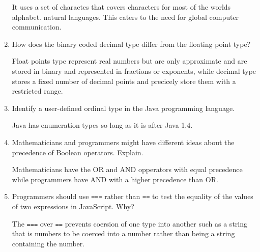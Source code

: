 \begin{enumerate}
  \begin{answer}

   It uses a set of charactes that covers characters for most of the worlds alphabet.  natural languages. This caters to the need for global computer communication.

    \end{answer}

  \item How does the binary coded decimal type differ from the
    floating point type?

  \begin{answer}

    Float points type represent real numbers but are only approximate and are stored in binary and represented in fractions or exponents, while decimal type stores a fixed number of decimal points and precicely store them with a restricted range.

    \end{answer}

  \item Identify a user-defined ordinal type in the Java programming
    language.

  \begin{answer}

    Java has enumeration types so long as it is after Java 1.4.

    \end{answer}

  \item Mathematicians and programmers might have different ideas
    about the precedence of Boolean operators. Explain.

  \begin{answer}

   Mathematicians have the OR and AND opperators with equal precedence while programmers have AND with a higher precedence than OR.

    \end{answer}

  \item Programmers should use \verb+===+ rather than \verb+==+ to
    test the equality of the values of two expressions in JavaScript. Why?

  \begin{answer}

    The  \verb+===+ over \verb+==+ prevents coersion of one type into another such as a string that is numbers to be coerced into a number rather than being a string containing the number.


\end{answer}
\end{enumerate}
